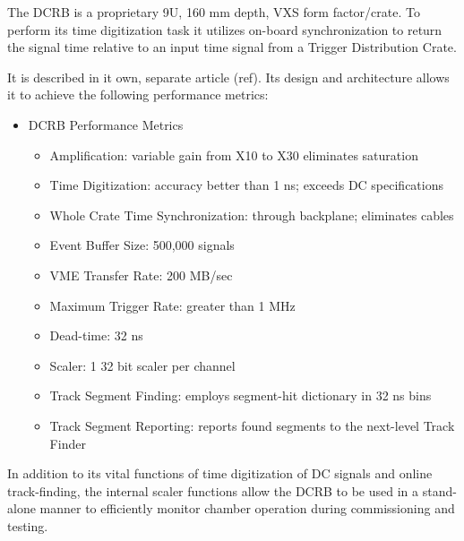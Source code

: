 The DCRB is a proprietary 9U, 160 mm depth, VXS form factor/crate.
To perform its time digitization task it utilizes on-board synchronization to
return the signal time relative to an input time signal from  a Trigger Distribution
Crate.

It is described in it own, separate article (ref).  Its design and architecture
allows it to achieve the following performance metrics:
\begin{itemize}
\item DCRB Performance Metrics
\begin{itemize}
\item Amplification: variable gain from X10 to X30 eliminates saturation
\item Time Digitization: accuracy better than 1 ns; exceeds DC specifications
\item Whole Crate Time Synchronization: through backplane; eliminates cables
\item Event Buffer Size: 500,000 signals
\item VME Transfer Rate: 200 MB/sec
\item Maximum Trigger Rate: greater than 1 MHz
\item Dead-time: 32 ns
\item Scaler: 1 32 bit scaler per channel
\item Track Segment Finding: employs segment-hit dictionary in 32 ns bins
\item Track Segment Reporting: reports found segments to the next-level Track Finder
\end{itemize}
\end{itemize}

In addition to its vital functions of time digitization of DC signals and online
track-finding, the internal scaler functions allow the DCRB to be used in 
a stand-alone manner to efficiently monitor chamber operation during commissioning
and testing.

